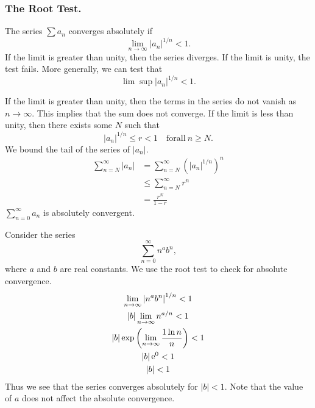 \subsubsection{The Root Test.}


\begin{Result}
  The series $\sum a_n$ converges absolutely if
  \[ 
  \lim_{n \to \infty} |a_n|^{1/n} < 1.
  \]
  If the limit is greater than unity, then the series diverges.  If the 
  limit is unity, the test fails.  More generally, we can test that
  \[
  \lim \sup |a_n|^{1/n} < 1.
  \]
\end{Result}




If the limit is greater than unity, then the terms in the series do not
vanish as $n \to \infty$.  This implies that the sum does not converge.
If the limit is less than unity, then there exists some $N$ such that 
\[ 
|a_n|^{1/n} \leq r < 1 \quad \mathrm{for all}\ n \geq N.
\]
We bound the tail of the series of $|a_n|$.
\begin{align*}
  \sum_{n=N}^\infty |a_n|
  &= \sum_{n=N}^\infty \left( |a_n|^{1/n} \right)^n 
  \\
  &\leq \sum_{n=N}^\infty r^n 
  \\
  &= \frac{r^N}{1-r}
\end{align*}
$\sum_{n = 0}^\infty a_n$ is absolutely convergent.






\begin{Example}
  Consider the series
  \[
  \sum_{n = 0}^\infty n^a b^n,
  \]
  where $a$ and $b$ are real constants.  We use the root test to check for 
  absolute convergence.
  \begin{gather*}
    \lim_{n \to \infty} \left| n^a b^n \right|^{1/n} < 1 
    \\
    |b| \lim_{n \to \infty} n^{a/n} < 1 
    \\
    |b| \exp \left( \lim_{n \to \infty} \frac{1 \ln n}{n} \right) < 1 
    \\
    |b| \mathop{\mathrm{e}}\nolimits^0 < 1 
    \\
    |b| < 1
  \end{gather*}
  Thus we see that the series converges absolutely for $|b| < 1$.
  Note that the value of $a$ does not affect the absolute convergence.
\end{Example}







